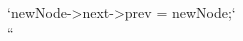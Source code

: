 \documentclass[preview]{standalone}
\begin{document}
`newNode->next->prev = newNode;`\\``\\
\end{document}
